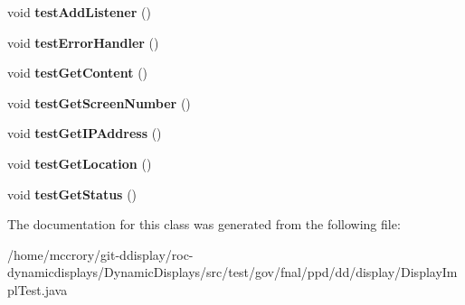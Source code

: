\begin{DoxyCompactItemize}
\item 
\hypertarget{classtest_1_1gov_1_1fnal_1_1ppd_1_1dd_1_1display_1_1DisplayImplTest_a0712fdc64836a4db68c6b7dc138e654b}{void {\bfseries test\-Add\-Listener} ()}\label{classtest_1_1gov_1_1fnal_1_1ppd_1_1dd_1_1display_1_1DisplayImplTest_a0712fdc64836a4db68c6b7dc138e654b}

\item 
\hypertarget{classtest_1_1gov_1_1fnal_1_1ppd_1_1dd_1_1display_1_1DisplayImplTest_a95221bf0c828171b7416f67146742356}{void {\bfseries test\-Error\-Handler} ()}\label{classtest_1_1gov_1_1fnal_1_1ppd_1_1dd_1_1display_1_1DisplayImplTest_a95221bf0c828171b7416f67146742356}

\item 
\hypertarget{classtest_1_1gov_1_1fnal_1_1ppd_1_1dd_1_1display_1_1DisplayImplTest_af6c021d0c40bf17371f5ec348b1952f1}{void {\bfseries test\-Get\-Content} ()}\label{classtest_1_1gov_1_1fnal_1_1ppd_1_1dd_1_1display_1_1DisplayImplTest_af6c021d0c40bf17371f5ec348b1952f1}

\item 
\hypertarget{classtest_1_1gov_1_1fnal_1_1ppd_1_1dd_1_1display_1_1DisplayImplTest_ae75ef33d21eee00cd2d946f6930bc4c4}{void {\bfseries test\-Get\-Screen\-Number} ()}\label{classtest_1_1gov_1_1fnal_1_1ppd_1_1dd_1_1display_1_1DisplayImplTest_ae75ef33d21eee00cd2d946f6930bc4c4}

\item 
\hypertarget{classtest_1_1gov_1_1fnal_1_1ppd_1_1dd_1_1display_1_1DisplayImplTest_a04be333aa1449938f99b135b21252aec}{void {\bfseries test\-Get\-I\-P\-Address} ()}\label{classtest_1_1gov_1_1fnal_1_1ppd_1_1dd_1_1display_1_1DisplayImplTest_a04be333aa1449938f99b135b21252aec}

\item 
\hypertarget{classtest_1_1gov_1_1fnal_1_1ppd_1_1dd_1_1display_1_1DisplayImplTest_aabee964c785c7d8572b967bc85eb3093}{void {\bfseries test\-Get\-Location} ()}\label{classtest_1_1gov_1_1fnal_1_1ppd_1_1dd_1_1display_1_1DisplayImplTest_aabee964c785c7d8572b967bc85eb3093}

\item 
\hypertarget{classtest_1_1gov_1_1fnal_1_1ppd_1_1dd_1_1display_1_1DisplayImplTest_a0bb4b26ab8030dd23b781d7b3d2cffab}{void {\bfseries test\-Get\-Status} ()}\label{classtest_1_1gov_1_1fnal_1_1ppd_1_1dd_1_1display_1_1DisplayImplTest_a0bb4b26ab8030dd23b781d7b3d2cffab}

\end{DoxyCompactItemize}


The documentation for this class was generated from the following file\-:\begin{DoxyCompactItemize}
\item 
/home/mccrory/git-\/ddisplay/roc-\/dynamicdisplays/\-Dynamic\-Displays/src/test/gov/fnal/ppd/dd/display/Display\-Impl\-Test.\-java\end{DoxyCompactItemize}
